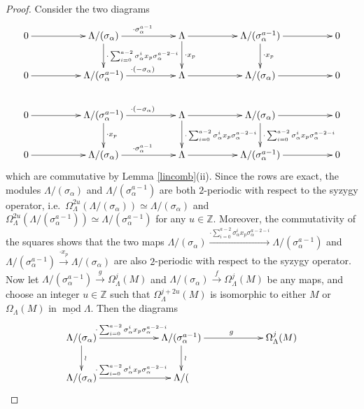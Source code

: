 \documentclass[a4paper]{amsart}
\theoremstyle{definition}
\theoremstyle{definition}
\theoremstyle{definition}
\theoremstyle{definition}
\theoremstyle{definition}
\theoremstyle{definition}
\theoremstyle{remark}
\theoremstyle{remark}
\theoremstyle{definition}
\theoremstyle{definition}
\begin{document}
\begin{proof}
Consider the two diagrams
$$\xymatrix@C=50pt{
0 \ar[r] & \Lambda / ( \sigma_{\alpha} ) \ar[d]^{\cdot
\sum_{i=0}^{a-2} \sigma_{\alpha}^i x_p \sigma_{\alpha}^{a-2-i}}
\ar[r]^{\cdot \sigma_{\alpha}^{a-1}} & \Lambda \ar[d]^{\cdot x_p}
\ar[r] & \Lambda / ( \sigma_{\alpha}^{a-1} ) \ar[d]^{\cdot x_p}
\ar[r] & 0 \\
0 \ar[r] & \Lambda / ( \sigma_{\alpha}^{a-1} ) \ar[r]^{\cdot ( -
\sigma_{\alpha})} & \Lambda \ar[r] & \Lambda / ( \sigma_{\alpha} )
\ar[r] & 0 \\
0 \ar[r] & \Lambda / ( \sigma_{\alpha}^{a-1} ) \ar[d]^{\cdot x_p}
\ar[r]^{\cdot (- \sigma_{\alpha})} & \Lambda \ar[d]^{\cdot
\sum_{i=0}^{a-2} \sigma_{\alpha}^i x_p \sigma_{\alpha}^{a-2-i}}
\ar[r] & \Lambda / ( \sigma_{\alpha} ) \ar[d]^{\cdot
\sum_{i=0}^{a-2} \sigma_{\alpha}^i x_p \sigma_{\alpha}^{a-2-i}}
\ar[r] & 0 \\
0 \ar[r] & \Lambda / ( \sigma_{\alpha} ) \ar[r]^{\cdot
\sigma_{\alpha}^{a-1}} & \Lambda \ar[r] & \Lambda / (
\sigma_{\alpha}^{a-1} ) \ar[r] & 0 }$$ which are commutative by
Lemma \ref{lincomb}(ii). Since the rows are exact, the modules
$\Lambda / ( \sigma_{\alpha} )$ and $\Lambda / (
\sigma_{\alpha}^{a-1} )$ are both $2$-periodic with respect to the
syzygy operator, i.e.\ $\Omega_{\Lambda}^{2u} ( \Lambda / (
\sigma_{\alpha} ) ) \simeq \Lambda / ( \sigma_{\alpha} )$ and
$\Omega_{\Lambda}^{2u} ( \Lambda / ( \sigma_{\alpha}^{a-1} ) )
\simeq \Lambda / ( \sigma_{\alpha}^{a-1} )$ for any $u \in
\mathbb{Z}$. Moreover, the commutativity of the squares shows that
the two maps $\Lambda / ( \sigma_{\alpha} ) \xrightarrow{\cdot
\sum_{i=0}^{a-2} \sigma_{\alpha}^i x_p \sigma_{\alpha}^{a-2-i}}
\Lambda / ( \sigma_{\alpha}^{a-1} )$ and $\Lambda / (
\sigma_{\alpha}^{a-1} ) \xrightarrow{\cdot x_p} \Lambda / (
\sigma_{\alpha} )$ are also $2$-periodic with respect to the syzygy
operator. Now let $\Lambda / ( \sigma_{\alpha}^{a-1} )
\xrightarrow{g} \Omega_{\Lambda}^j(M)$ and $\Lambda / (
\sigma_{\alpha} ) \xrightarrow{f} \Omega_{\Lambda}^j(M)$ be any
maps, and choose an integer $u \in \mathbb{Z}$ such that
$\Omega_{\Lambda}^{j+2u}(M)$ is isomorphic to either $M$ or
$\Omega_{\Lambda}(M)$ in $\underline{\operatorname{mod}\nolimits} \Lambda$. Then the
diagrams
$$\xymatrix@C=60pt{
\Lambda / ( \sigma_{\alpha} ) \ar[r]^{\cdot \sum_{i=0}^{a-2}
\sigma_{\alpha}^i x_p \sigma_{\alpha}^{a-2-i}} \ar[d]^{\wr} &
\Lambda / ( \sigma_{\alpha}^{a-1} ) \ar[r]^g \ar[d]^{\wr} &
\Omega_{\Lambda}^j(M) \\
\Lambda / ( \sigma_{\alpha} ) \ar[r]^{\cdot \sum_{i=0}^{a-2}
\sigma_{\alpha}^i x_p \sigma_{\alpha}^{a-2-i}} & \Lambda / (
}$$
\end{proof}
\end{document}

